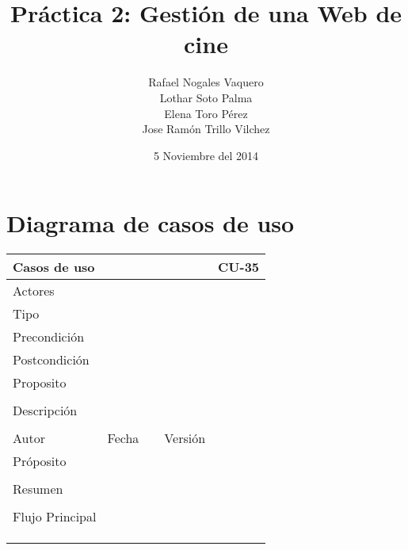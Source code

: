 \documentclass{article}
\title{Práctica 2: Gestión de una Web de cine}
\author{Rafael Nogales Vaquero
\\Lothar Soto Palma
\\Elena Toro Pérez
\\Jose Ramón Trillo Vilchez}
\date{5 Noviembre del 2014}
\begin{document}
\maketitle
\section{Diagrama de casos de uso}
\begin{table}[h]
\begin{tabular}{|l|l|l|l|l|l|}
\hline
\multicolumn{2}{|p{2cm}|}{Casos de uso}  & \multicolumn{3}{p{7cm}|}{} & CU-35 \\
\hline
\multicolumn{2}{|p{2cm}|}{Actores}       & \multicolumn{4}{p{8cm}|}{}        \\
\hline
\multicolumn{2}{|p{2cm}|}{Tipo}          & \multicolumn{4}{p{8cm}|}{}        \\
\hline
\multicolumn{2}{|p{2cm}|}{Precondición}  & \multicolumn{4}{p{8cm}|}{}        \\
\hline
\multicolumn{2}{|p{2cm}|}{Postcondición} & \multicolumn{4}{p{8cm}|}{}        \\
\hline
\multicolumn{6}{|p{10cm}|}{Proposito}                                   \\
\hline
\multicolumn{6}{|p{10cm}|}{}                                            \\
\hline
\multicolumn{6}{|p{10cm}|}{Descripción}                                 \\
\hline
\multicolumn{6}{|p{10cm}|}{}                                            \\
\hline
Autor          &              &  Fecha   &     &   Versión  & \\     
\hline
\multicolumn{6}{|p{10cm}|}{Próposito}\\
\hline
\multicolumn{6}{|p{10cm}|}{}\\
\hline
\multicolumn{6}{|p{10cm}|}{Resumen}\\
\hline
\multicolumn{6}{|p{10cm}|}{}\\
\hline
\multicolumn{6}{|p{10cm}|}{Flujo Principal}\\
\hline
\multicolumn{1}{|p{1cm}|}{} & \multicolumn{2}{p{3cm}}{} & \multicolumn{1}{|p{1cm}|}{} & \multicolumn{2}{p{3cm}|}{}\\
\hline
\multicolumn{1}{|p{1cm}|}{} & \multicolumn{2}{p{3cm}}{} & \multicolumn{1}{|p{1cm}|}{} & \multicolumn{2}{p{3cm}|}{}\\
\hline
\multicolumn{1}{|p{1cm}|}{} & \multicolumn{2}{p{3cm}}{} & \multicolumn{1}{|p{1cm}|}{} & \multicolumn{2}{p{3cm}|}{}\\

\end{tabular}
\end{table}
\end{document}
